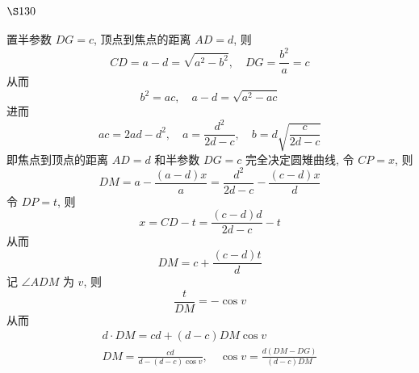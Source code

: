 \section{$\S 130$}

置半参数 $D G=c$, 顶点到焦点的距离 $A D=d$, 则
\[
C D=a-d=\sqrt{a^{2}-b^{2}}, \quad D G=\frac{b^{2}}{a}=c
\]
从而
\[
b^{2}=a c, \quad a-d=\sqrt{a^{2}-a c}
\]
进而
\[
a c=2 a d-d^{2}, \quad a=\frac{d^{2}}{2 d-c}, \quad b=d \sqrt{\frac{c}{2 d-c}}
\]
即焦点到顶点的距离 $A D=d$ 和半参数 $D G=c$ 完全决定圆雉曲线, 令 $C P=x$, 则
\[
D M=a-\frac{(a-d) x}{a}=\frac{d^{2}}{2 d-c}-\frac{(c-d) x}{d}
\]
令 $D P=t$, 则
\[
x=C D-t=\frac{(c-d) d}{2 d-c}-t
\]
从而
\[
D M=c+\frac{(c-d) t}{d}
\]
记 $\angle A D M$ 为 $v$, 则
\[
\frac{t}{D M}=-\cos v
\]
从而
\[
\begin{gathered}
d \cdot D M=c d+(d-c) D M \cos v \\
D M=\frac{c d}{d-(d-c) \cos v}, \quad \cos v=\frac{d(D M-D G)}{(d-c) D M}
\end{gathered}
\]
